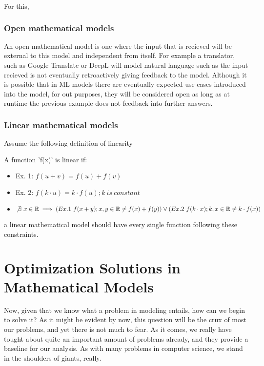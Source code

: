 \documentclass{textbook}
\begin{document}
For this, 

\subsection{Open mathematical models}

An open mathematical model is one where the input that is recieved will be external to this model and
independent from itself. For example a translator, such as Google Translate or DeepL will model natural language
such as the input recieved is not eventually retroactively giving feedback to the model. Although it is possible that
in ML models there are eventually expected use cases introduced into the model, for out purposes, they will be considered 
open as long as at runtime the previous example does not feedback into further answers.

\subsection{Linear mathematical models}

Assume the following definition of linearity

A function 'f(x)' is linear if:
\begin{itemize}
    \item Ex. 1: $f(u+v) = f(u) + f(v)$
    \item Ex. 2: $f(k \cdot u) = k \cdot f(u) ; k \ is \ constant$
    \item $\not \exists \ x \in \mathbb{R}  \implies (Ex. 1 \ f(x+y); x,y \in \mathbb{R} \neq f(x) +f(y)) \lor (Ex. 2 \ f(k \cdot x); k, x \in \mathbb{R} \neq k \cdot f(x)) $
\end{itemize}

a linear mathematical model should have every single function following these constraints. 


\chapter{Optimization Solutions in Mathematical Models}

Now, given that we know what a problem in modeling entails, how can we begin
to solve it? As it might be evident by now, this question will be the crux of most our
problems, and yet there is not much to fear. As it comes, we really have tought about quite an
important amount of problems already, and they provide a baseline for our analysis. As with
many problems in computer science, we stand in the shoulders of giants, really.
\end{document}
